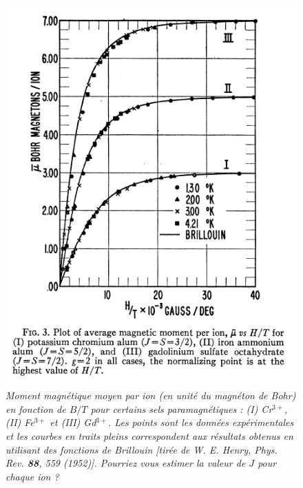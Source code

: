 \documentclass[utf8, 11pt]{feuille}
\begin{document}
\begin{figure}[h]
\begin{center} 
\includegraphics[height=.5\textwidth]{brillouin}
\caption{\it Moment magnétique moyen par ion (en unité du magnéton de Bohr) en fonction de $B/T$ pour certains sels paramagnétiques : (I) Cr$^{3+}$, (II) Fe$^{3+}$ et (III) Gd$^{3+}$.  Les points sont les données expérimentales et les courbes en traits pleins correspondent aux résultats obtenus en utilisant des fonctions de Brillouin [tirée de W. E. Henry, Phys. Rev. \textbf{88}, 559 (1952)]. Pourriez vous estimer la valeur de $J$ pour chaque ion ?}
\end{center} 
\end{figure}
\end{document}
